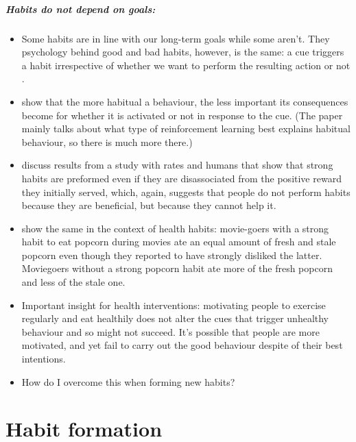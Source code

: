 \documentclass[a4paper, 11pt]{report}
\begin{document}
\paragraph{Habits do not depend on goals:}
\begin{itemize}
	\item Some habits are in line with our long-term goals while some aren't. They psychology behind good and bad habits, however, is the same: a cue triggers a habit irrespective of whether we want to perform the resulting action or not \citep{neal2013people}.

	\item \citet{dezfouli2012habits} show that the more habitual a behaviour, the less important its consequences become for whether it is activated or not in response to the cue. (The paper mainly talks about what type of reinforcement learning best explains habitual behaviour, so there is much more there.)

	\item \citet{runger2015maintenance} discuss results from a study with rates and humans that show that strong habits are preformed even if they are disassociated from the positive reward they initially served, which, again, suggests that people do not perform habits because they are beneficial, but because they cannot help it.

	\item \citet{neal2011pull} show the same in the context of health habits: movie-goers with a strong habit to eat popcorn during movies ate an equal amount of fresh and stale popcorn even though they reported to have strongly disliked the latter. Moviegoers without a strong popcorn habit ate more of the fresh popcorn and less of the stale one.

	\item Important insight for health interventions: motivating people to exercise regularly and eat healthily does not alter the cues that trigger unhealthy behaviour and so might not succeed. It's possible that people are more motivated, and yet fail to carry out the good behaviour despite of their best intentions.

	\item How do I overcome this when forming new habits?
\end{itemize}




\chapter{Habit formation}
\end{document}
